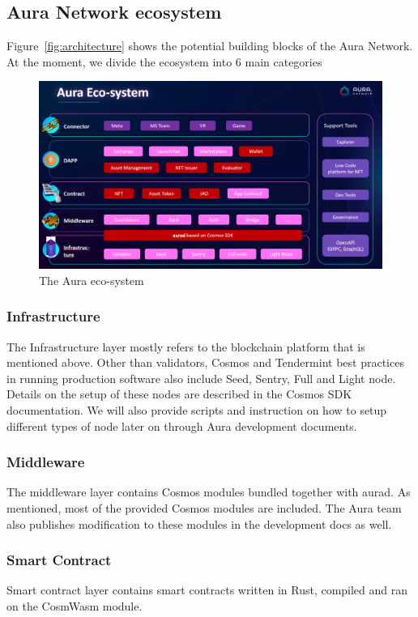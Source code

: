 \documentclass[12pt]{article}
\begin{document}
\subsection{Aura Network ecosystem}
Figure~\ref{fig:architecture} shows the potential building blocks of the Aura Network. At the moment, we divide the ecosystem into 6 main categories

\begin{figure}[ht]
\label{fig:auraeco}
\includegraphics[width=14cm]{img/auraeco.png}
\centering
\caption{The Aura eco-system}
\end{figure}

\subsubsection*{Infrastructure}
The Infrastructure layer mostly refers to the blockchain platform that is mentioned above. Other than validators, Cosmos and Tendermint best practices in running production software also include Seed, Sentry, Full and Light node. Details on the setup of these nodes are described in the Cosmos SDK documentation. We will also provide scripts and instruction on how to setup different types of node later on through Aura development documents.

\subsubsection*{Middleware}
The middleware layer contains Cosmos modules bundled together with aurad. As mentioned, most of the provided Cosmos modules are included. The Aura team also publishes modification to these modules in the development docs as well.

\subsubsection*{Smart Contract}
Smart contract layer contains smart contracts written in Rust, compiled and ran on the CosmWasm module.
\end{document}
